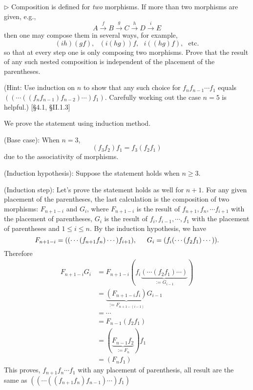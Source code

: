 \begin{problem}[4.1]
  $\rhd$ Composition is defined for \textit{two} morphisms. If more than two
  morphisms are given, e.g.,
  \[ A \xrightarrow{f} B \xrightarrow{g} C \xrightarrow{h} D \xrightarrow{i} E \]
  then one may compose them in several ways, for example,
  \[ (ih)(gf),\,\,\,\,(i(hg))f,\,\,\,\,i((hg)f),\,\,\,\,\text{etc.}\]
  so that at every step one is only composing two morphisms. Prove that the result
  of any such nested composition is independent of the placement of the
  parentheses.
  
  (Hint: Use induction on $n$ to show that any such choice for $f_nf_{n-1}\cdots f_1$ equals
$((\cdots((f_nf_{n-1})f_{n-2}) \cdots)f_1)$.
Carefully working out the case $n = 5$ is helpful.) [\S 4.1, \S II.1.3]
\end{problem}

\begin{solution}
We prove the statement using induction method.

\noindent(Base case): When $n=3$, $$(f_3f_2)f_1 = f_3(f_2f_1)$$ due to the associativity of morphisms.

\noindent(Induction hypothesis): Suppose the statement holds when $n\geq 3$.

\noindent(Induction step): Let's prove the statement holds as well for $n+1$. For any given placement of 
the parentheses, the last calculation is the composition of two morphisms: $F_{n+1-i}$ and $G_{i}$, where $F_{n+1-i}$ is 
the result of $f_{n+1},f_{n},\cdots f_{i+1}$ with the placement of parentheses, $G_{i}$ is the result of 
$f_i,f_{i-1},\cdots, f_1$ with the placement of parentheses and $1\leq i \leq n$. 
By the induction hypothesis, we have
$$F_{n+1-i}=((\cdots(f_{n+1}f_{n})\cdots)f_{i+1}), \indent G_{i}=(f_{i}(\cdots(f_2f_1)\cdots)).$$
Therefore
\begin{equation*}
\begin{split}
F_{n+1-i}G_{i}&=F_{n+1-i}(f_{i}\underbrace{(\cdots(f_2f_1)\cdots)}_{:=G_{i-1}})\\
&=\underbrace{(F_{n+1-i}f_i)}_{:=F_{n+1-(i-1)}}G_{i-1}\\
&=\cdots \\
&=F_{n-1}(f_2f_1)\\
&=(\underbrace{F_{n-1}f_2}_{:=F_{n}})f_1\\
&=(F_{n}f_1)
\end{split}
\end{equation*}
This proves, $f_{n+1}f_{n}\cdots f_1$ with any placement of parenthesis, all result are the same as $((\cdots((f_{n+1}f_{n})f_{n-1}) \cdots)f_1)$
\end{solution}

